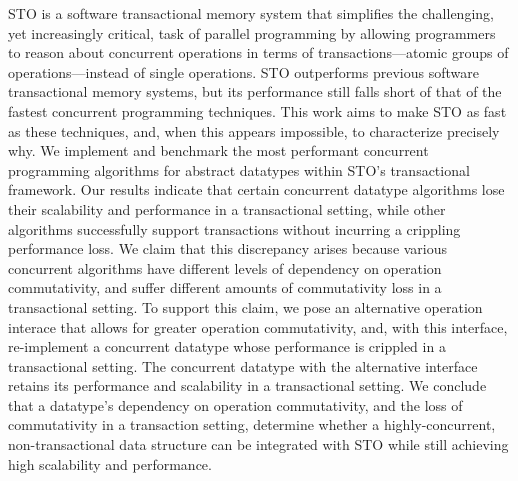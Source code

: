 STO is a software transactional memory system that simplifies the challenging, yet increasingly critical, task of parallel programming by allowing programmers to reason about concurrent operations in terms of transactions---atomic groups of operations---instead of single operations.  
STO outperforms previous software transactional memory systems, but its performance still falls short of that of the fastest concurrent programming techniques. This work aims to make STO as fast as these techniques, and, when this appears impossible, to characterize precisely why. 
We implement and benchmark the most performant concurrent programming algorithms for abstract datatypes within STO's transactional framework. Our results indicate that certain concurrent datatype algorithms lose their scalability and performance in a transactional setting, while other algorithms successfully support transactions without incurring a crippling performance loss. We claim that this discrepancy arises because various concurrent algorithms have different levels of dependency on operation commutativity, and suffer different amounts of commutativity loss in a transactional setting. To support this claim, we pose an alternative operation interace that allows for greater operation commutativity, and, with this interface, re-implement a concurrent datatype whose performance is crippled in a transactional setting. The concurrent datatype with the alternative interface retains its performance and scalability in a transactional setting.
We conclude that a datatype's dependency on operation commutativity, and the loss of commutativity in a transaction setting, determine whether a highly-concurrent, non-transactional data structure can be integrated with STO while still achieving high scalability and performance.
